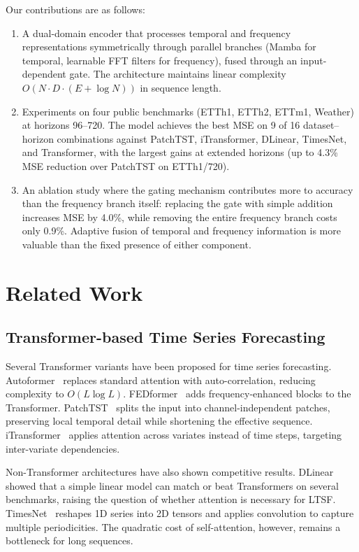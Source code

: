 \documentclass[symmetry,article,submit,pdftex,moreauthors]{Definitions/mdpi}
\begin{document}
Our contributions are as follows:

\begin{enumerate}
\item A dual-domain encoder that processes temporal and frequency representations symmetrically through parallel branches (Mamba for temporal, learnable FFT filters for frequency), fused through an input-dependent gate. The architecture maintains linear complexity $O(N \cdot D \cdot (E + \log N))$ in sequence length.
\item Experiments on four public benchmarks (ETTh1, ETTh2, ETTm1, Weather) at horizons 96--720. The model achieves the best MSE on 9 of 16 dataset--horizon combinations against PatchTST, iTransformer, DLinear, TimesNet, and Transformer, with the largest gains at extended horizons (up to 4.3\% MSE reduction over PatchTST on ETTh1/720).
\item An ablation study where the gating mechanism contributes more to accuracy than the frequency branch itself: replacing the gate with simple addition increases MSE by 4.0\%, while removing the entire frequency branch costs only 0.9\%. Adaptive fusion of temporal and frequency information is more valuable than the fixed presence of either component.
\end{enumerate}

\section{Related Work}

\subsection{Transformer-based Time Series Forecasting}

Several Transformer variants have been proposed for time series forecasting. Autoformer~\cite{ref6} replaces standard attention with auto-correlation, reducing complexity to $O(L \log L)$. FEDformer~\cite{ref7} adds frequency-enhanced blocks to the Transformer. PatchTST~\cite{ref8} splits the input into channel-independent patches, preserving local temporal detail while shortening the effective sequence. iTransformer~\cite{ref9} applies attention across variates instead of time steps, targeting inter-variate dependencies.

Non-Transformer architectures have also shown competitive results. DLinear~\cite{ref13} showed that a simple linear model can match or beat Transformers on several benchmarks, raising the question of whether attention is necessary for LTSF. TimesNet~\cite{ref14} reshapes 1D series into 2D tensors and applies convolution to capture multiple periodicities. The quadratic cost of self-attention, however, remains a bottleneck for long sequences.
\end{document}
